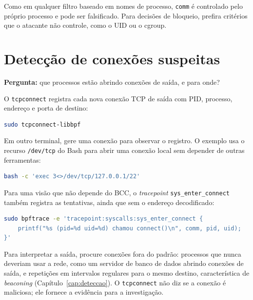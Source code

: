 Como em qualquer filtro baseado em nomes de processo, \texttt{comm} é controlado
pelo próprio processo e pode ser falsificado. Para decisões de bloqueio, prefira
critérios que o atacante não controle, como o UID ou o cgroup.

\section{Detecção de conexões suspeitas}
\label{sec:ex-conexoes}

\textbf{Pergunta:} que processos estão abrindo conexões de saída, e para onde?

O \texttt{tcpconnect} registra cada nova conexão TCP de saída com PID, processo,
endereço e porta de destino:

\begin{lstlisting}[language=bash, caption={Conexões TCP de saída com o \texttt{tcpconnect}.}]
sudo tcpconnect-libbpf
\end{lstlisting}

Em outro terminal, gere uma conexão para observar o registro. O exemplo usa o
recurso \texttt{/dev/tcp} do Bash para abrir uma conexão local sem depender de
outras ferramentas:

\begin{lstlisting}[language=bash, caption={Geração de uma conexão de teste.}]
bash -c 'exec 3<>/dev/tcp/127.0.0.1/22'
\end{lstlisting}

Para uma visão que não depende do BCC, o \textit{tracepoint}
\texttt{sys\_enter\_connect} também registra as tentativas, ainda que sem o
endereço decodificado:

\begin{lstlisting}[language=bash, caption={Tentativas de conexão com bpftrace.}]
sudo bpftrace -e 'tracepoint:syscalls:sys_enter_connect {
    printf("%s (pid=%d uid=%d) chamou connect()\n", comm, pid, uid);
}'
\end{lstlisting}

Para interpretar a saída, procure conexões fora do padrão: processos que nunca
deveriam usar a rede, como um servidor de banco de dados abrindo conexões de
saída, e repetições em intervalos regulares para o mesmo destino, característica
de \textit{beaconing} (Capítulo~\ref{cap:deteccao}). O \texttt{tcpconnect} não
diz se a conexão é maliciosa; ele fornece a evidência para a investigação.
